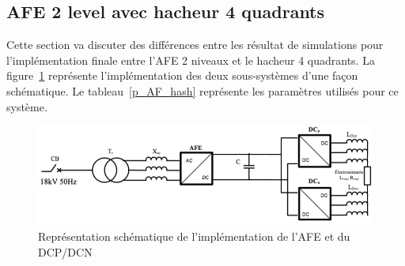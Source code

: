\documentclass[11pt,letterpaper,final]{report}
\begin{document}
\subsection{AFE 2 level avec hacheur 4 quadrants}
Cette section va discuter des différences entre les résultat de simulations pour l'implémentation finale entre l'AFE 2 niveaux et le hacheur 4 quadrants. La figure~\ref{AF_DC} représente l'implémentation des deux sous-systèmes d'une façon schématique. Le tableau~\ref{p_AF_hash} représente les paramètres utilisés pour ce système.

\begin{figure}[htb]
\centering
\includegraphics[scale=0.5]{Fig/Hach_AFE/AFE.jpg}
\caption{Représentation schématique de l'implémentation de l'AFE et du DCP/DCN}
\label{AF_DC}
\end{figure}
\end{document}
